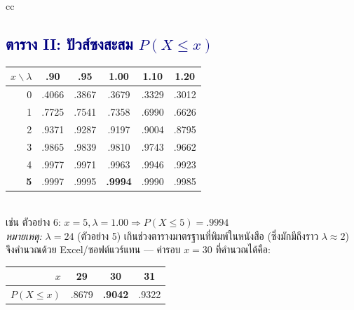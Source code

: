 \documentclass[9pt]{extarticle}
\begin{document}
\begin{center}
\begin{tabular}{cc}
\begin{minipage}{7.5cm}
\subsection*{\textcolor{navy}{ตาราง II: ปัวส์ซงสะสม $P(X\le x)$}}
\small
\begin{tabular}{r|ccccc}
\rowcolor{lightbg} $x\backslash \lambda$ & .90 & .95 & 1.00 & 1.10 & 1.20\\\hline
0 & .4066 & .3867 & .3679 & .3329 & .3012\\
1 & .7725 & .7541 & .7358 & .6990 & .6626\\
2 & .9371 & .9287 & .9197 & .9004 & .8795\\
3 & .9865 & .9839 & .9810 & .9743 & .9662\\
4 & .9977 & .9971 & .9963 & .9946 & .9923\\
\textbf{5} & .9997 & .9995 & \textbf{.9994} & .9990 & .9985\\
\end{tabular}\\[3pt]
\small เช่น ตัวอย่าง 6: $x{=}5,\lambda{=}1.00 \Rightarrow P(X\le5){=}.9994$\\[6pt]
\small\textit{หมายเหตุ:} $\lambda{=}24$ (ตัวอย่าง 5) เกินช่วงตารางมาตรฐานที่พิมพ์ในหนังสือ (ซึ่งมักมีถึงราว $\lambda{\approx}2$) จึงคำนวณด้วย Excel/ซอฟต์แวร์แทน — ค่ารอบ $x{=}30$ ที่คำนวณได้คือ:\\[3pt]
\begin{tabular}{r|ccc}
\rowcolor{lightbg} $x$ & 29 & \textbf{30} & 31\\\hline
$P(X\le x)$ & .8679 & \textbf{.9042} & .9322\\
\end{tabular}
\end{minipage}
\end{tabular}
\end{center}
\end{document}
